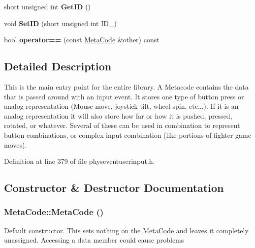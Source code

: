 \begin{DoxyCompactItemize}
\item 
\hypertarget{classMetaCode_a4556130570fdc8bf531be7f15519fafe}{
short unsigned int {\bfseries GetID} ()}
\label{d7/d72/classMetaCode_a4556130570fdc8bf531be7f15519fafe}

\item 
\hypertarget{classMetaCode_ae39bd781449cc01d7bce48c1e9da089d}{
void {\bfseries SetID} (short unsigned int ID\_\-)}
\label{d7/d72/classMetaCode_ae39bd781449cc01d7bce48c1e9da089d}

\item 
\hypertarget{classMetaCode_a296b774682a9326494e0c2d1b357ec2a}{
bool {\bfseries operator==} (const \hyperlink{classMetaCode}{MetaCode} \&other) const }
\label{d7/d72/classMetaCode_a296b774682a9326494e0c2d1b357ec2a}

\end{DoxyCompactItemize}


\subsection{Detailed Description}
This is the main entry point for the entire library. A Metacode contains the data that is passed around with an input event. It stores one type of button press or analog representation (Mouse move, joystick tilt, wheel spin, etc...). If it is an analog representation it will also store how far or how it is pushed, pressed, rotated, or whatever. Several of these can be used in combination to represent button combinations, or complex input combination (like portions of fighter game moves). 

Definition at line 379 of file physeventuserinput.h.

\subsection{Constructor \& Destructor Documentation}
\hypertarget{classMetaCode_a6d4637b2894e5a2d46577c08259a2416}{
\subsubsection[{MetaCode}]{\setlength{\rightskip}{0pt plus 5cm}MetaCode::MetaCode ()}}
\label{d7/d72/classMetaCode_a6d4637b2894e5a2d46577c08259a2416}


Default constructor. This sets nothing on the \hyperlink{classMetaCode}{MetaCode} and leaves it completely unassigned. Accessing a data member could cause problems 


